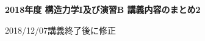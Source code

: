 \documentclass[10pt,a4j]{jarticle}
\newlength{\minitwocolumn}
\begin{document}
\newcommand{\fat}[1]{\mbox{\boldmath $#1$}}
\newcommand{\D}{\partial}
\newcommand{\w}{\omega}
\newcommand{\ga}{\alpha}
\newcommand{\gb}{\beta}
\newcommand{\gx}{\xi}
\newcommand{\gz}{\zeta}
\newcommand{\vhat}[1]{\hat{\fat{#1}}}
\newcommand{\spc}{\vspace{0.7\baselineskip}}
\newcommand{\halfspc}{\vspace{0.3\baselineskip}}

\newcommand{\twofig}[2]
 {
   \begin{figure}
     \begin{minipage}[t]{\minitwocolumn}
         \begin{center}   #1
         \end{center}
     \end{minipage}
         \hspace{\columnsep}
     \begin{minipage}[t]{\minitwocolumn}
         \begin{center} #2
         \end{center}
     \end{minipage}
   \end{figure}
 }
\begin{center}
	{\Large \bf 2018年度 構造力学I及び演習B 講義内容のまとめ2} \\
\end{center}
\begin{flushright}
	2018/12/07講義終了後に修正
\end{flushright}
\end{document}
